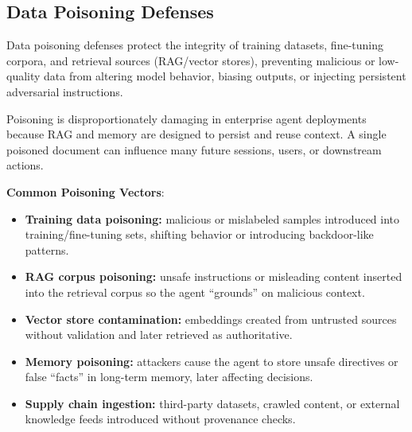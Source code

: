 \begin{TNtwocol}
    \section{Data Poisoning Defenses}

    Data poisoning defenses protect the integrity of training datasets, fine-tuning corpora, and retrieval sources (RAG/vector stores), preventing malicious or low-quality data from altering model behavior, biasing outputs, or injecting persistent adversarial instructions.

    Poisoning is disproportionately damaging in enterprise agent deployments because RAG and memory are designed to persist and reuse context. A single poisoned document can influence many future sessions, users, or downstream actions.

    \textbf{Common Poisoning Vectors}:
    \begin{itemize}
        \item \textbf{Training data poisoning:} malicious or mislabeled samples introduced into training/fine-tuning sets, shifting behavior or introducing backdoor-like patterns.
        \item \textbf{RAG corpus poisoning:} unsafe instructions or misleading content inserted into the retrieval corpus so the agent “grounds” on malicious context.
        \item \textbf{Vector store contamination:} embeddings created from untrusted sources without validation and later retrieved as authoritative.
        \item \textbf{Memory poisoning:} attackers cause the agent to store unsafe directives or false “facts” in long-term memory, later affecting decisions.
        \item \textbf{Supply chain ingestion:} third-party datasets, crawled content, or external knowledge feeds introduced without provenance checks.
    \end{itemize}


\end{TNtwocol}

